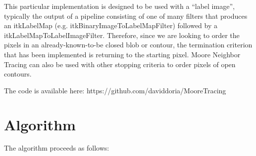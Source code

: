 \documentclass{InsightArticle}
\begin{document}
This particular implementation is designed to be used with a ``label image'', typically the output of a pipeline consisting of one of many filters that produces an itkLabelMap (e.g. itkBinaryImageToLabelMapFilter) followed by a itkLabelMapToLabelImageFilter. Therefore, since we are looking to order the pixels in an already-known-to-be closed blob or contour, the termination criterion that has been implemented is returning to the starting pixel. Moore Neighbor Tracing can also be used with other stopping criteria to order pixels of open contours.

The code is available here:
https://github.com/daviddoria/MooreTracing

\section{Algorithm}
The algorithm proceeds as follows:
\end{document}
